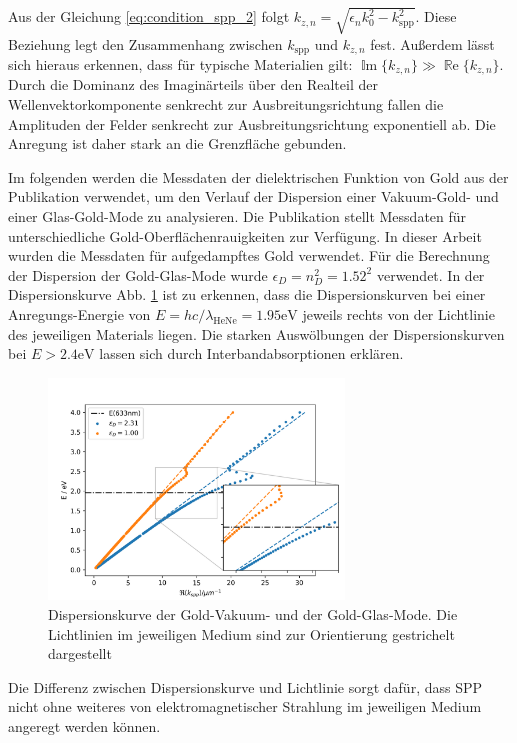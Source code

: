 \documentclass[titlepage]{article}
\renewcommand{\Re}{\operatorname{\mathbb{R}e}}
\renewcommand{\Im}{\operatorname{\mathbb{I}m}}
\begin{document}
	Aus der Gleichung \eqref{eq:condition_spp_2} folgt $k_{z, n} = \sqrt{\epsilon_n k_0^2 - k_{\mathrm{spp}}^2}$. Diese Beziehung legt den Zusammenhang zwischen $k_{\mathrm{spp}}$ und $k_{z, n}$ fest. Außerdem lässt sich hieraus erkennen, dass für typische Materialien gilt: $ \Im\{k_{z, n}\} \gg \Re\{k_{z, n}\}$. Durch die Dominanz des Imaginärteils über den Realteil der Wellenvektorkomponente senkrecht zur Ausbreitungsrichtung fallen die Amplituden der Felder senkrecht zur Ausbreitungsrichtung exponentiell ab. Die Anregung ist daher stark an die Grenzfläche gebunden. 
	
	Im folgenden werden die Messdaten der dielektrischen Funktion von Gold aus der Publikation \cite{Olmon.2012} verwendet, um den Verlauf der Dispersion einer Vakuum-Gold- und einer Glas-Gold-Mode zu analysieren.  Die Publikation stellt Messdaten für unterschiedliche Gold-Oberflächenrauigkeiten zur Verfügung. In dieser Arbeit wurden die Messdaten für aufgedampftes Gold verwendet. Für die Berechnung der Dispersion der Gold-Glas-Mode wurde $\epsilon_D = n_D^2 = 1.52^2$  verwendet. In der Dispersionskurve Abb. \ref{fig:dispersion_spp} ist zu erkennen, dass die Dispersionskurven bei einer Anregungs-Energie von $E = hc/\lambda_{\mathrm{HeNe}}= 1.95\mathrm{eV}$ jeweils rechts von der Lichtlinie des jeweiligen Materials liegen. Die starken Auswölbungen der Dispersionskurven bei $E > 2.4 \mathrm{eV}$ lassen sich durch Interbandabsorptionen erklären.
	\begin{figure}[h]
		\label{fig:dispersion_spp}
		\centering
		\includegraphics[width=0.7\textwidth]{figures/dispersion.png}
		\caption{Dispersionskurve der Gold-Vakuum- und der Gold-Glas-Mode. Die Lichtlinien im jeweiligen Medium sind zur Orientierung gestrichelt dargestellt}		
	\end{figure}
	Die Differenz zwischen Dispersionskurve und Lichtlinie sorgt dafür, dass SPP nicht ohne weiteres von elektromagnetischer Strahlung im jeweiligen Medium angeregt werden können.	
\end{document}
